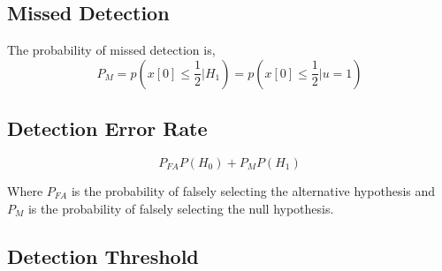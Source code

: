 \documentclass[12pt]{article}
\begin{document}
\subsection{Missed Detection}

The probability of missed detection is,
\begin{equation}
    P_M = p(x[0] \leq \frac{1}{2}| H_1) = p(x[0] \leq \frac{1}{2}|u = 1)
\end{equation}

\subsection{Detection Error Rate}

\begin{equation}
    P_{FA}P(H_0) + P_MP(H_1)
\end{equation}

Where $P_{FA}$ is the probability of falsely selecting the alternative hypothesis and $P_M$ is the probability
of falsely selecting the null hypothesis.

\subsection{Detection Threshold}
\end{document}
